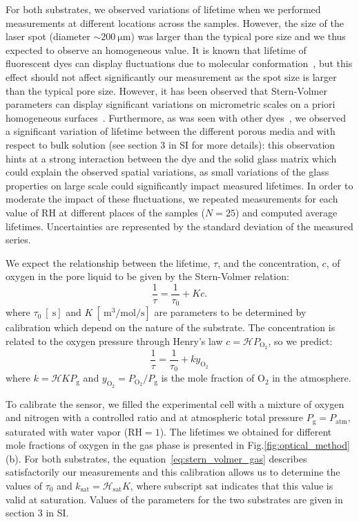 \documentclass[aps,prl,twocolumn,superscriptaddress,groupedaddress]{revtex4}
\begin{document}
For both substrates, we observed variations of lifetime when we performed measurements at different locations across the samples. However, the size of the laser spot (diameter $\sim \SI{200}{\micro\meter}$) was larger than the typical pore size and we thus expected to observe an homogeneous value. It is known that lifetime of fluorescent dyes can display fluctuations due to molecular conformation~\cite{tinnefeld_2000,esipova_2011}, but this effect should not affect significantly our measurement as the spot size is larger than the typical pore size. However, it has been observed that Stern-Volmer parameters can display significant variations on micrometric scales on a priori homogeneous surfaces~\cite{bedlekanslow_2000,kneas_2000}. Furthermore, as was seen with other dyes~\cite{kennelly_1985,shi_1985}, we observed a significant variation of lifetime between the different porous media and with respect to bulk solution (see section 3 in SI for more details): this observation hints at a strong interaction between the dye and the solid glass matrix which could explain the observed spatial variations, as small variations of the glass properties on large scale could significantly impact measured lifetimes.  In order to moderate the impact of these fluctuations, we repeated measurements for each value of $\mathrm{RH}$ at different places of the samples ($N=25$) and computed average lifetimes. Uncertainties are represented by the standard deviation of the measured series. 

We expect the relationship between the lifetime, $\tau$, and the concentration, $c$, of oxygen in the pore liquid to be given by the Stern-Volmer relation:
\begin{equation}
\frac{1}{\tau} = \frac{1}{\tau_0} + K c.
\label{eq:stern_volmer_liquid}
\end{equation}
\noindent where $\tau_0 \ [\SI{}{\second}]$ and $K \ [\SI{}{\meter\cubed\per\mole\per\second}]$ are parameters to be determined by calibration which depend on the nature of the substrate. The concentration is related to the oxygen pressure through Henry's law $c = \mathcal{H} P_\mathrm{O_2}$, so we predict:
\begin{equation}
\frac{1}{\tau} = \frac{1}{\tau_0} + k y_\mathrm{O_2}
\label{eq:stern_volmer_gas}
\end{equation}
\noindent where $k=\mathcal{H} K P_\text{g}$ and $y_\mathrm{O_2}=P_\mathrm{O_2}/P_\text{g}$ is the mole fraction of $\mathrm{O_2}$ in the atmosphere.

To calibrate the sensor, we filled the experimental cell with a mixture of oxygen and nitrogen with a controlled ratio and at atmospheric total pressure $P_\text{g}=P_\text{atm}$, saturated with water vapor ($\mathrm{RH}=1$). The lifetimes we obtained for different mole fractions of oxygen in the gas phase is presented in Fig.\ref{fig:optical_method}(b). For both substrates, the equation~\eqref{eq:stern_volmer_gas} describes satisfactorily our measurements and this calibration allows us to determine the values of $\tau_0$ and $k_\text{sat}=\mathcal{H}_\text{sat} K$, where subscript $\text{sat}$ indicates that this value is valid at saturation. Values of the parameters for the two substrates are given in section 3 in SI.
\end{document}
